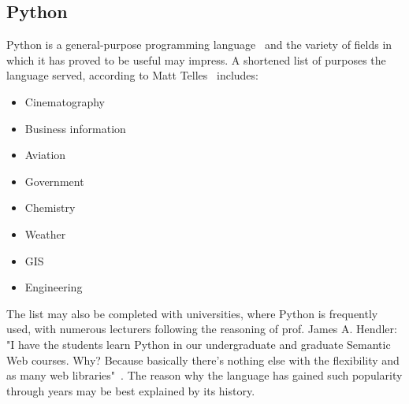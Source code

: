 \subsection{Python}\label{subsec:py}
Python is a general-purpose programming language~\cite[page 3]{py_nutshell} and the variety of fields in which it has proved to be useful may impress. A shortened list of purposes the language served, according to Matt Telles~\cite[page 13]{py_power} includes:
\begin{itemize}
\item{Cinematography}
\item{Business information}
\item{Aviation}
\item{Government}
\item{Chemistry}
\item{Weather}
\item{GIS}
\item{Engineering}
\end{itemize}
The list may also be completed with universities, where Python is frequently used, with numerous lecturers following the reasoning of prof. James A. Hendler: "I have the students learn Python in our undergraduate and graduate Semantic Web courses. Why? Because basically there's nothing else with the flexibility and as many web libraries"~\cite{py_quote}. The reason why the language has gained such popularity through years may be best explained by its history.

